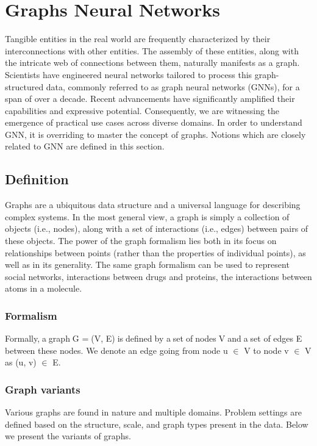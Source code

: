 \section{Graphs Neural Networks}
\label{gnnsoa}
Tangible entities in the real world are frequently characterized by their interconnections with other entities. The assembly of these entities, along with the intricate web of connections between them, naturally manifests as a graph. 
Scientists have engineered neural networks tailored to process this graph-structured data, commonly referred to as graph neural networks (GNNs), for a span of over a decade. Recent advancements have significantly amplified their capabilities and expressive potential. Consequently, we are witnessing the emergence of practical use cases across diverse domains. In order to understand GNN, it is overriding to master the concept of graphs. Notions which are closely related to GNN are defined in this section.
\subsection{Definition}
Graphs are a ubiquitous data structure and a universal language for describing complex systems. In the most general view, a graph is simply a collection of objects (i.e., nodes), along with a set of interactions (i.e., edges) between pairs of these objects.
The power of the graph formalism lies both in its focus on relationships between points (rather than the properties of individual points), as well as in its generality. The same graph formalism can be used to represent social networks, interactions between drugs and proteins, the interactions between atoms in a molecule.
\subsubsection{Formalism}
Formally,\textcolor{white}{.}a\textcolor{white}{.}graph\textcolor{white}{.}G =\textcolor{white}{.}(V, E)\textcolor{white}{.}is\textcolor{white}{.}defined\textcolor{white}{.}by a\textcolor{white}{.}set\textcolor{white}{.}of\textcolor{white}{.}nodes\textcolor{white}{.}V\textcolor{white}{.}and\textcolor{white}{.}a\textcolor{white}{.}set of edges E between these nodes. We denote an edge going from node u $\in$ V to node v $\in$ V as (u, v) $\in$ E. 
\subsubsection{Graph variants}
Various graphs are found in nature and multiple domains. Problem settings are defined based on the structure, scale, and graph types present in the data. Below we present the variants of graphs.


